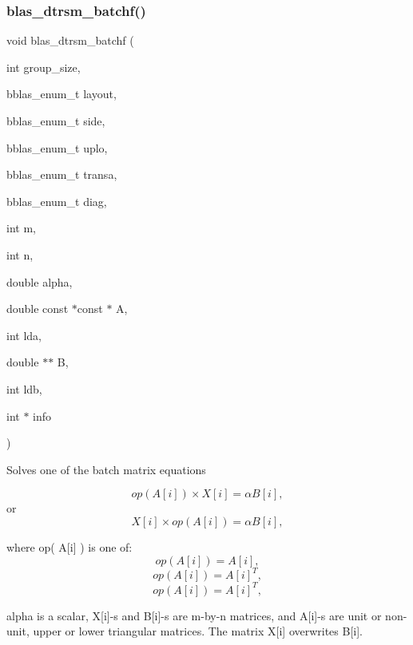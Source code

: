 \subsubsection{\texorpdfstring{blas\+\_\+dtrsm\+\_\+batchf()}{blas\_dtrsm\_batchf()}}
{\footnotesize\ttfamily void blas\+\_\+dtrsm\+\_\+batchf (\begin{DoxyParamCaption}\item[{int}]{group\+\_\+size,  }\item[{bblas\+\_\+enum\+\_\+t}]{layout,  }\item[{bblas\+\_\+enum\+\_\+t}]{side,  }\item[{bblas\+\_\+enum\+\_\+t}]{uplo,  }\item[{bblas\+\_\+enum\+\_\+t}]{transa,  }\item[{bblas\+\_\+enum\+\_\+t}]{diag,  }\item[{int}]{m,  }\item[{int}]{n,  }\item[{double}]{alpha,  }\item[{double const $\ast$const $\ast$}]{A,  }\item[{int}]{lda,  }\item[{double $\ast$$\ast$}]{B,  }\item[{int}]{ldb,  }\item[{int $\ast$}]{info }\end{DoxyParamCaption})}

Solves one of the batch matrix equations

\[ op( A[i] )\times X[i] = \alpha B[i], \] or \[ X[i] \times op( A[i] ) = \alpha B[i], \]

where op( A\mbox{[}i\mbox{]} ) is one of\+: \[ op( A[i] ) = A[i], \] \[ op( A[i] ) = A[i]^T, \] \[ op( A[i] ) = A[i]^T, \]

alpha is a scalar, X\mbox{[}i\mbox{]}-\/s and B\mbox{[}i\mbox{]}-\/s are m-\/by-\/n matrices, and A\mbox{[}i\mbox{]}-\/s are unit or non-\/unit, upper or lower triangular matrices. The matrix X\mbox{[}i\mbox{]} overwrites B\mbox{[}i\mbox{]}.


